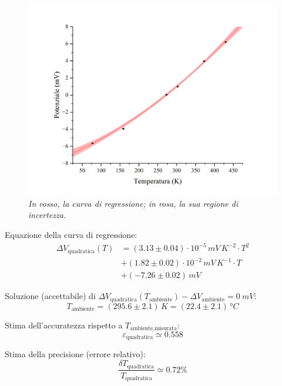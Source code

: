 \documentclass{article}
\begin{document}
\pagebreak
\begin{figure}[H]
  \centering
  \includegraphics[trim={2cm 0.6cm 3cm 1cm},clip,width=\textwidth]{img/regressione2.png}
  \caption*{\emph{
    In rosso, la curva di regressione; in rosa, la sua regione di incertezza.
  }}
\end{figure}

Equazione della curva di regressione:
\[\begin{aligned}\Delta V_\text{quadratica}(T)
  &= (3.13\pm0.04)\cdot10^{-5}\,\unit{mV\,K^{-2}}\cdot T^2 \\
  &+ (1.82\pm0.02)\cdot10^{-2}\,\unit{mV\,K^{-1}}\cdot T \\
  &+ (-7.26\pm0.02)\,\unit{mV}
\end{aligned}\]

Soluzione (accettabile) di $
  \Delta V_\text{quadratica}(T_\text{ambiente}) -
  \Delta V_\text{ambiente} = \qty{0}{mV}$:
\[T_\text{ambiente}
  = (295.6\pm2.1)\,\unit{K}
  = (22.4\pm2.1)\,\unit{\degree C}
\]

Stima dell'accuratezza rispetto a $T_\text{ambiente,misurata}$:
\[ \varepsilon_\text{quadratica} \simeq 0.558 \]

Stima della precisione (errore relativo):
\[ \frac{\delta T_\text{quadratica}}{T_\text{quadratica}} \simeq 0.72\% \]
\end{document}
